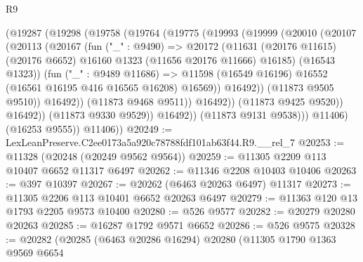 \begin{lexlean}{R9}
\begin{coremodule}
                        (@19287
                          (@19298
                            (@19758
                              (@19764
                                (@19775
                                  (@19993
                                    (@19999
                                      (@20010
                                        (@20107
                                          (@20113
                                            (@20167
                                              (fun ("_" : @9490) =>
                                              @20172
                                                (@11631
                                                  (@20176 @11615)
                                                  (@20176 @6652)
                                                  @16160
                                                  @1323
                                                  (@11656 @20176 @11666)
                                                  @16185)
                                                (@16543 @1323))
                                              (fun ("_" : @9489 @11686) =>
                                              @11598
                                                (@16549 @16196)
                                                @16552
                                                (@16561 @16195 @416 @16565 @16208)
                                                @16569))
                                            @16492))
                                        (@11873 @9505 @9510))
                                      @16492))
                                  (@11873 @9468 @9511))
                                @16492))
                            (@11873 @9425 @9520))
                          @16492))
                      (@11873 @9330 @9529))
                    @16492))
                (@11873 @9131 @9538)))
            @11406)
          (@16253 @9555))
        @11406))
@20249 := LexLeanPreserve.C2ee0173a5a920c78788fdf101ab63f44.R9.__rel_7
@20253 := @11328 (@20248 (@20249 @9562 @9564))
@20259 := @11305 @2209 @113 @10407 @6652 @11317 @6497
@20262 := @11346 @2208 @10403 @10406
@20263 := @397 @10397
@20267 := @20262 (@6463 @20263 @6497) @11317
@20273 := @11305 @2206 @113 @10401 @6652 @20263 @6497
@20279 := @11363 @120 @13 @1793 @2205 @9573 @10400
@20280 := @526 @9577
@20282 := @20279 @20280 @20263
@20285 := @16287 @1792 @9571 @6652
@20286 := @526 @9575
@20328 := @20282
    (@20285
      (@6463 @20286 @16294)
      @20280
      (@11305
        @1790
        @1363
        @9569
        @6654

\end{coremodule}
\end{lexlean}
